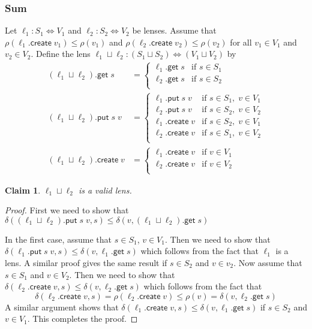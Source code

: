 \documentclass[acmsmall,review,anonymous]{acmart}\settopmatter{printfolios=true,printccs=false,printacmref=false}
\newtheorem{claim}{Claim}
\newcommand{\kw}[1]{\ensuremath{\mathsf{#1}}}
\newcommand{\get}{\ensuremath{\kw{get}}}
\newcommand{\pput}{\ensuremath{\kw{put}}}
\newcommand{\create}{\ensuremath{\kw{create}}}
\begin{document}
\subsubsection{Sum}
Let $\ell_1 : S_1 \Leftrightarrow V_1$ and $\ell_2 : S_2 \Leftrightarrow V_2$ be
lenses. Assume that $\rho(\ell_1.\create \; v_1) \leq
\rho(v_1)$ and $\rho(\ell_2.\create \; v_2) \leq
\rho(v_2)$ for all $v_1 \in V_1$ and $v_2 \in V_2$. Define the lens $\ell_1
\sqcup \ell_2 : (S_1 \sqcup S_2) \Leftrightarrow (V_1 \sqcup V_2)$ by
\begin{align*}
(\ell_1 \sqcup \ell_2).\get \; s &=
\begin{cases}
\ell_1.\get \; s & \text{if } s \in S_1\\
\ell_2.\get \; s & \text{if } s \in S_2\\
\end{cases}\\
(\ell_1 \sqcup \ell_2).\pput \; s \; v&=
\begin{cases}
\ell_1.\pput \; s \; v& \text{if } s \in S_1, \; v \in V_1\\
\ell_2.\pput \; s \; v& \text{if } s \in S_2, \; v \in V_2\\
\ell_1.\create \; v & \text{if } s \in S_2, \; v \in V_1\\
\ell_2.\create \; v & \text{if } s \in S_1, \; v \in V_2\\
\end{cases}\\
(\ell_1 \sqcup \ell_2).\create \; v &=
\begin{cases}
\ell_1.\create \; v & \text{if } v \in V_1\\
\ell_2.\create \; v & \text{if } v \in V_2\\
\end{cases}
\end{align*}
\begin{claim}
$\ell_1 \sqcup \ell_2$ is a valid lens.
\end{claim}
\begin{proof}
First we need to show that $\delta((\ell_1 \sqcup \ell_2).\pput \; s \; v, s)
\leq \delta(v, (\ell_1 \sqcup \ell_2).\get \; s)$

In the first case, assume that $s \in S_1$, $v \in V_1$. Then we need to show
that $\delta(\ell_1.\pput \; s \; v, s) \leq \delta(v, \ell_1.\get \; s)$
which follows from the fact that $\ell_1$ is a lens. A similar proof gives the
same result if $s \in S_2$ and $v \in v_2$. Now assume that $s \in S_1$ and $v
\in V_2$. Then we need to show that
$\delta(\ell_2.\create \; v, s) \leq \delta(v, \ell_2.\get \; s)$ which follows
from the fact that 
$$\delta(\ell_2.\create \; v, s) = \rho(\ell_2.\create \; v) \leq
\rho(v) = \delta(v, \ell_2.\get \; s)$$
A similar argument shows that $\delta(\ell_1.\create \; v, s) \leq \delta(v,
\ell_1.\get \; s)$ if $s \in S_2$ and $v \in V_1$. This completes the proof.
\end{proof}
\end{document}
